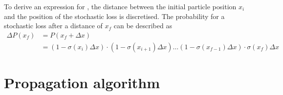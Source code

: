 To derive an expression for \label{eqn:cum}, the distance between the initial particle position $x_i$ and the position of the stochastic loss is discretised.
The probability for a stochastic loss after a distance of $x_f$ can be described as
\begin{align}
	\Delta P\left(x_f\right) &= P\left( x_f + \Delta x \right)\\
	&= \left( 1 - \sigma\left( x_i \right) \Delta x \right) \cdot \left( 1 - \sigma\left( x_{i+1} \right) \Delta x \right) \dots \left( 1 - \sigma\left( x_{f-1} \right) \Delta x \right) \cdot \sigma\left( x_f \right) \Delta x
\end{align}


\section{Propagation algorithm}
\label{sec:algorithm}
